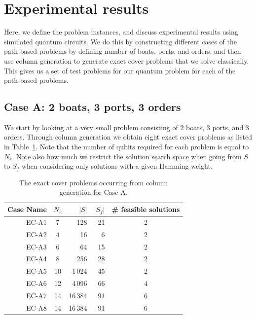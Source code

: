 \documentclass{article}
\begin{document}
\section{Experimental results}
Here, we define the problem instances, and discuss experimental results using simulated quantum circuits. We do this by constructing different cases of the path-based problems by defining number of boats, ports, and orders, and then use column generation to generate exact cover problems that we solve classically. This gives us a set of test problems for our quantum problem for each of the path-based problems.

\subsection{Case A: 2 boats, 3 ports, 3 orders}
We start by looking at a very small problem consisting of 2 boats, 3 ports, and 3 orders. Through column generation we obtain eight exact cover problems as listed in Table~\ref{tab:caseA}. Note that the number of qubits required for each problem is equal to $N_r$. Note also how much we restrict the solution search space when going from $S$ to $S_f$ when considering only solutions with a given Hamming weight.


\begin{table}
\centering
{} %
\begin{tabular}{r c r r c}
\rowcolor{headerblue!80} %
{\textbf{Case Name}} & 
{\textbf{$N_r$}} & {\textbf{$|S|$}} & 
{\textbf{$|S_f|$}} & {\textbf{\# feasible solutions}}  \\
\midrule
EC-A1 & 7 & 128 & 21 & 2 \\
EC-A2 & 4 & 16 & 6 & 2 \\
EC-A3 & 6 & 64 & 15 & 2 \\
EC-A4 & 8 & 256 & 28 & 2 \\
EC-A5 & 10 & 1\,024 & 45 & 2 \\
EC-A6 & 12 & 4\,096 & 66 & 4 \\
EC-A7 & 14 & 16\,384 & 91 & 6 \\
EC-A8 & 14 & 16\,384 & 91 & 6 \\
\end{tabular}
\caption{The exact cover problems occurring from column generation for Case A.}
\label{tab:caseA}
\end{table}
\end{document}
